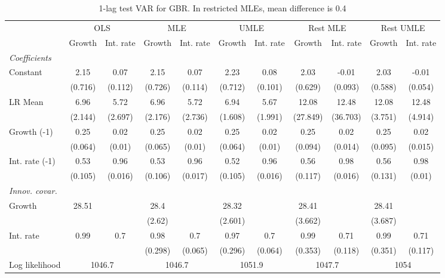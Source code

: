 \begin{table}[htbp] 
	\centering
	\begin{tabular}{@{\extracolsep{4pt}}lcccccccccc@{}}		\hline\hline
		 		 & \multicolumn{2}{c}{OLS} &\multicolumn{2}{c}{MLE} &\multicolumn{2}{c}{UMLE} &\multicolumn{2}{c}{Rest MLE} &\multicolumn{2}{c}{Rest UMLE} \\ 
 		 & Growth 	 & Int. rate 	 & Growth 	 & Int. rate 	 & Growth 	 & Int. rate 	 & Growth 	 & Int. rate 	 & Growth 	 & Int. rate\\\cline{2-3}\cline{4-5}\cline{6-7}\cline{8-9}\cline{10-11}
\rule{0pt}{4ex} 
 \emph{Coefficients} 	  		 & 		 & 		 & 		 & 		 & 		 & 		 & 		 & 		 & 		 &\\ 
\quad Constant 	 & 2.15 	 & 0.07 	 & 2.15 	 & 0.07 	 & 2.23 	 & 0.08 	 & 2.03 	 & -0.01 	 & 2.03 	 & -0.01	 \\ 
 		 & (0.716) 	 & (0.112) 	 & (0.726) 	 & (0.114) 	 & (0.712) 	 & (0.101) 	 & (0.629) 	 & (0.093) 	 & (0.588) 	 & (0.054) 	 \\ 
\quad LR Mean 	 & 6.96 	 & 5.72 	 & 6.96 	 & 5.72 	 & 6.94 	 & 5.67 	 & 12.08 	 & 12.48 	 & 12.08 	 & 12.48	 \\ 
 		 & (2.144) 	 & (2.697) 	 & (2.176) 	 & (2.736) 	 & (1.608) 	 & (1.991) 	 & (27.849) 	 & (36.703) 	 & (3.751) 	 & (4.914) 	 \\ 
\quad Growth (-1) 	 &0.25 	 & 0.02 	 & 0.25 	 & 0.02 	 & 0.25 	 & 0.02 	 & 0.25 	 & 0.02 	 & 0.25 	 & 0.02	 \\ 
 		 & (0.064) 	 & (0.01) 	 & (0.065) 	 & (0.01) 	 & (0.064) 	 & (0.01) 	 & (0.094) 	 & (0.014) 	 & (0.095) 	 & (0.015) 	 \\ 
\quad Int. rate (-1) 	 &0.53 	 & 0.96 	 & 0.53 	 & 0.96 	 & 0.52 	 & 0.96 	 & 0.56 	 & 0.98 	 & 0.56 	 & 0.98	 \\ 
 		 & (0.105) 	 & (0.016) 	 & (0.106) 	 & (0.017) 	 & (0.105) 	 & (0.016) 	 & (0.117) 	 & (0.016) 	 & (0.131) 	 & (0.01) 	 \\ 
\rule{0pt}{4ex} \emph{Innov. covar.}  	 & 	 & 	 & 	 & 	 & 	 & 	 & 	 & 	 & 	 &\\ 
\quad Growth 	 &28.51 	 &  	 & 28.4 	 &  	 & 28.32 	 &  	 & 28.41 	 &  	 & 28.41 	 & 	 \\ 
 		 &  	 &  	 & (2.62) 	 &  	 & (2.601) 	 &  	 & (3.662) 	 &  	 & (3.687) 	 &  	 \\ 
\quad Int. rate 	 &0.99 	 & 0.7 	 & 0.98 	 & 0.7 	 & 0.97 	 & 0.7 	 & 0.99 	 & 0.71 	 & 0.99 	 & 0.71	 \\ 
 		 &  	 &  	 & (0.298) 	 & (0.065) 	 & (0.296) 	 & (0.064) 	 & (0.353) 	 & (0.118) 	 & (0.351) 	 & (0.117) 	 \\ 
 \hline \rule{0pt}{4ex} 
  Log likelihood 	 &\multicolumn{2}{c}{1046.7} 	 & \multicolumn{2}{c}{1046.7} 	 & \multicolumn{2}{c}{1051.9} 	 & \multicolumn{2}{c}{1047.7} 	 & \multicolumn{2}{c}{1054}\\ 

 \hline 	\end{tabular}		\caption{1-lag test VAR for GBR. In restricted MLEs, mean difference is 0.4}
		\label{tab:GBR1lag}

\end{table}